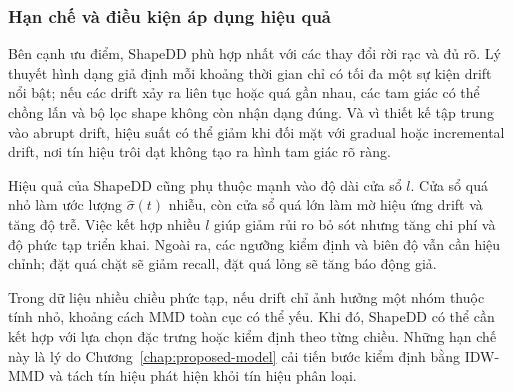 \subsubsection{Hạn chế và điều kiện áp dụng hiệu quả}
Bên cạnh ưu điểm, ShapeDD phù hợp nhất với các thay đổi rời rạc và đủ rõ. Lý thuyết hình dạng giả định mỗi khoảng thời gian chỉ có tối đa một sự kiện drift nổi bật; nếu các drift xảy ra liên tục hoặc quá gần nhau, các tam giác có thể chồng lấn và bộ lọc shape không còn nhận dạng đúng. Và vì thiết kế tập trung vào abrupt drift, hiệu suất có thể giảm khi đối mặt với gradual hoặc incremental drift, nơi tín hiệu trôi dạt không tạo ra hình tam giác rõ ràng.

Hiệu quả của ShapeDD cũng phụ thuộc mạnh vào độ dài cửa sổ $l$. Cửa sổ quá nhỏ làm ước lượng $\hat{\sigma}(t)$ nhiễu, còn cửa sổ quá lớn làm mờ hiệu ứng drift và tăng độ trễ. Việc kết hợp nhiều $l$ giúp giảm rủi ro bỏ sót nhưng tăng chi phí và độ phức tạp triển khai. Ngoài ra, các ngưỡng kiểm định và biên độ vẫn cần hiệu chỉnh; đặt quá chặt sẽ giảm recall, đặt quá lỏng sẽ tăng báo động giả.

Trong dữ liệu nhiều chiều phức tạp, nếu drift chỉ ảnh hưởng một nhóm thuộc tính nhỏ, khoảng cách MMD toàn cục có thể yếu. Khi đó, ShapeDD có thể cần kết hợp với lựa chọn đặc trưng hoặc kiểm định theo từng chiều. Những hạn chế này là lý do Chương~\ref{chap:proposed-model} cải tiến bước kiểm định bằng IDW-MMD và tách tín hiệu phát hiện khỏi tín hiệu phân loại.
